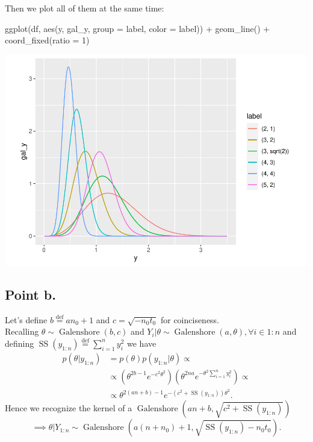 \documentclass[
  11pt,
]{article}
\newenvironment{Shaded}{\begin{snugshade}}{\end{snugshade}}
\newcommand{\AttributeTok}[1]{\textcolor[rgb]{0.77,0.63,0.00}{#1}}
\newcommand{\DecValTok}[1]{\textcolor[rgb]{0.00,0.00,0.81}{#1}}
\newcommand{\FunctionTok}[1]{\textcolor[rgb]{0.00,0.00,0.00}{#1}}
\newcommand{\NormalTok}[1]{#1}
\newcommand{\SpecialCharTok}[1]{\textcolor[rgb]{0.00,0.00,0.00}{#1}}
\begin{document}
\normalsize

Then we plot all of them at the same time: \vspace{0.5cm}

\scriptsize

\begin{Shaded}
\begin{Highlighting}[]
\FunctionTok{ggplot}\NormalTok{(df, }\FunctionTok{aes}\NormalTok{(y, gal\_y, }\AttributeTok{group =}\NormalTok{ label, }\AttributeTok{color =}\NormalTok{ label)) }\SpecialCharTok{+}
\FunctionTok{geom\_line}\NormalTok{() }\SpecialCharTok{+} \FunctionTok{coord\_fixed}\NormalTok{(}\AttributeTok{ratio =} \DecValTok{1}\NormalTok{)}
\end{Highlighting}
\end{Shaded}

\begin{center}\includegraphics[width=0.6\linewidth]{1_hw_bs_code_files/figure-latex/unnamed-chunk-2-1} \end{center}
\normalsize

\hypertarget{point-b.}{%
\subsection{Point b.}\label{point-b.}}

Let's define \(b \stackrel{\text{def}}{=}an_0 + 1\) and
\(c = \sqrt{-n_0t_0}\) for coinciseness.\\
Recalling \(\theta \sim \operatorname{Galenshore}\left(b, c\right)\) and
\(Y_i | \theta \sim \operatorname{Galenshore}\left(a, \theta\right), \forall i \in 1:n\)
and defining
\(\operatorname{SS}\left(y_{1:n}\right) \stackrel{\text{def}}{=}\sum_{i = 1}^n y_i^2\)
we have \begin{align*}
    p(\theta | y_{1:n}) & = p(\theta) p(y_{1:n} | \theta) \propto \\
    & \propto (\theta^{2b - 1} e^{-c^2\theta^2}) (\theta^{2na} e^{-\theta^2\sum_{i = 1}^n y_i^2}) \propto \\
    & \propto \theta^{2(an + b) - 1} e^{-(c^2 + \operatorname{SS}\left(y_{1:n}\right))\theta^2}.
\end{align*} Hence we recognize the kernel of a
\(\operatorname{Galenshore}\left(an + b, \sqrt{c^2 + \operatorname{SS}\left(y_{1:n}\right)}\right)\)
\[\implies \theta | Y_{1:n} \sim \operatorname{Galenshore}\left(a(n + n_0) + 1, \sqrt{\operatorname{SS}\left(y_{1:n}\right) - n_0t_0}\right).\]
\end{document}
